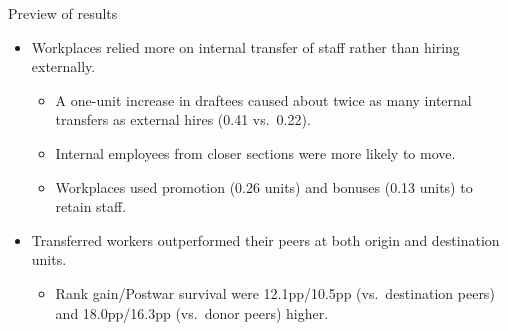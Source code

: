 \begin{frame}{Preview of results}
    \begin{itemize}[<+->]
        \item Workplaces relied more on internal transfer of staff rather than hiring externally.
        \begin{itemize}[<+->]
            \item A one-unit increase in draftees caused about twice as many internal transfers as external hires (0.41 vs.\ 0.22).
            \item Internal employees from closer sections were more likely to move.
            \item Workplaces used promotion (0.26 units) and bonuses (0.13 units) to retain staff.

        \end{itemize}

        \item Transferred workers outperformed their peers at both origin and destination units.
        \begin{itemize}[<+->]
            \item Rank gain/Postwar survival were 12.1pp/10.5pp (vs.\ destination peers) and 18.0pp/16.3pp (vs.\ donor peers) higher.
        \end{itemize}
    \end{itemize}
\end{frame}